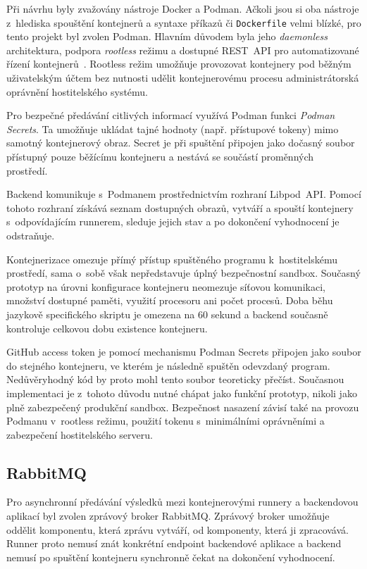 \documentclass[
  biblatex,
  figures,
  tables,
  glossaries,
  index
]{kidiplom}
\begin{document}
Při návrhu byly zvažovány nástroje Docker a Podman. Ačkoli jsou si oba nástroje z~hlediska spouštění kontejnerů a syntaxe příkazů či \texttt{Dockerfile} velmi blízké, pro tento projekt byl zvolen Podman. Hlavním důvodem byla jeho \textit{daemonless} architektura, podpora \textit{rootless} režimu a dostupné REST~API pro automatizované řízení kontejnerů~\cite{podman2}. Rootless režim umožňuje provozovat kontejnery pod běžným uživatelským účtem bez nutnosti udělit kontejnerovému procesu administrátorská oprávnění hostitelského systému.~\cite{podman}

Pro bezpečné předávání citlivých informací využívá Podman funkci \textit{Podman Secrets}. Ta umožňuje ukládat tajné hodnoty (např. přístupové tokeny) mimo samotný kontejnerový obraz. Secret je při spuštění připojen jako dočasný soubor přístupný pouze běžícímu kontejneru a nestává se součástí proměnných prostředí.~\cite{podmansecr}

Backend komunikuje s~Podmanem prostřednictvím rozhraní Libpod~API. Pomocí tohoto rozhraní získává seznam dostupných obrazů, vytváří a spouští kontejnery s~odpovídajícím runnerem, sleduje jejich stav a po dokončení vyhodnocení je odstraňuje.~\cite{podmanrapi}

Kontejnerizace omezuje přímý přístup spuštěného programu k~hostitelskému prostředí, sama o~sobě však nepředstavuje úplný bezpečnostní sandbox. Současný prototyp na úrovni konfigurace kontejneru neomezuje síťovou komunikaci, množství dostupné paměti, využití procesoru ani počet procesů. Doba běhu jazykově specifického skriptu je omezena na 60 sekund a backend současně kontroluje celkovou dobu existence kontejneru.

GitHub access token je pomocí mechanismu Podman Secrets připojen jako soubor do stejného kontejneru, ve kterém je následně spuštěn odevzdaný program. Nedůvěryhodný kód by proto mohl tento soubor teoreticky přečíst. Současnou implementaci je z~tohoto důvodu nutné chápat jako funkční prototyp, nikoli jako plně zabezpečený produkční sandbox. Bezpečnost nasazení závisí také na provozu Podmanu v~rootless režimu, použití tokenu s~minimálními oprávněními a zabezpečení hostitelského serveru.


\subsection{RabbitMQ}
Pro asynchronní předávání výsledků mezi kontejnerovými runnery a backendovou aplikací byl zvolen zprávový broker RabbitMQ. Zprávový broker umožňuje oddělit komponentu, která zprávu vytváří, od komponenty, která ji zpracovává. Runner proto nemusí znát konkrétní endpoint backendové aplikace a backend nemusí po spuštění kontejneru synchronně čekat na dokončení vyhodnocení.
\end{document}
